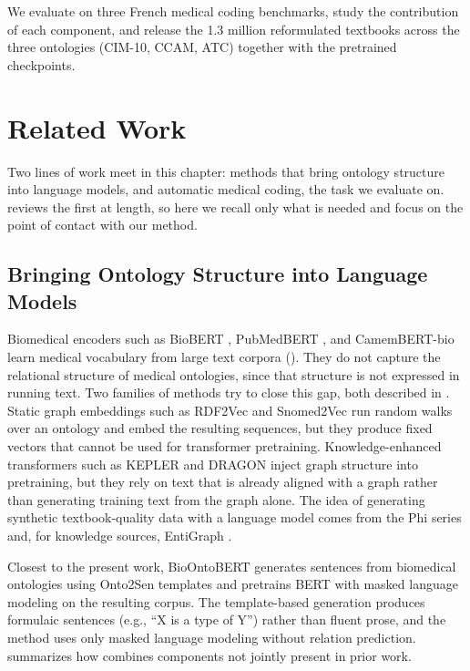 We evaluate \method on three French medical coding benchmarks, study the contribution of each component, and release the 1.3 million reformulated textbooks across the three ontologies (CIM-10, CCAM, ATC) together with the pretrained checkpoints.
\section{Related Work}
\label{sec:related}

Two lines of work meet in this chapter: methods that bring ontology structure into language models, and automatic medical coding, the task we evaluate on.  reviews the first at length, so here we recall only what is needed and focus on the point of contact with our method.

\subsection{Bringing Ontology Structure into Language Models}

Biomedical encoders such as BioBERT \citep{lee_biobert_2019}, PubMedBERT \citep{gu_domain-specific_2022}, and CamemBERT-bio \citep{touchent2023camembertbio} learn medical vocabulary from large text corpora (). They do not capture the relational structure of medical ontologies, since that structure is not expressed in running text. Two families of methods try to close this gap, both described in . Static graph embeddings such as RDF2Vec and Snomed2Vec run random walks over an ontology and embed the resulting sequences, but they produce fixed vectors that cannot be used for transformer pretraining. Knowledge-enhanced transformers such as KEPLER and DRAGON inject graph structure into pretraining, but they rely on text that is already aligned with a graph rather than generating training text from the graph alone. The idea of generating synthetic textbook-quality data with a language model comes from the Phi series \citep{gunasekar2023textbooks} and, for knowledge sources, EntiGraph \citep{yang2025entigraph}.

Closest to the present work, BioOntoBERT \citep{shashikumar2023bioontobert} generates sentences from biomedical ontologies using Onto2Sen templates and pretrains BERT with masked language modeling on the resulting corpus. The template-based generation produces formulaic sentences (e.g., ``X is a type of Y'') rather than fluent prose, and the method uses only masked language modeling without relation prediction.  summarizes how \method combines components not jointly present in prior work.

